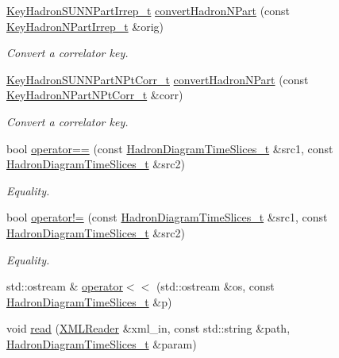 \begin{DoxyCompactItemize}
\mbox{\hyperlink{structHadron_1_1KeyHadronSUNNPartIrrep__t}{Key\+Hadron\+S\+U\+N\+N\+Part\+Irrep\+\_\+t}} \mbox{\hyperlink{namespaceHadron_a870585feaeca280be18774aa6242e2e9}{convert\+Hadron\+N\+Part}} (const \mbox{\hyperlink{structHadron_1_1KeyHadronNPartIrrep__t}{Key\+Hadron\+N\+Part\+Irrep\+\_\+t}} \&orig)
\begin{DoxyCompactList}\small\item\em Convert a correlator key. \end{DoxyCompactList}\item 
\mbox{\hyperlink{structHadron_1_1KeyHadronSUNNPartNPtCorr__t}{Key\+Hadron\+S\+U\+N\+N\+Part\+N\+Pt\+Corr\+\_\+t}} \mbox{\hyperlink{namespaceHadron_af69200410e93c702cf9e19f0c220bbef}{convert\+Hadron\+N\+Part}} (const \mbox{\hyperlink{structHadron_1_1KeyHadronNPartNPtCorr__t}{Key\+Hadron\+N\+Part\+N\+Pt\+Corr\+\_\+t}} \&corr)
\begin{DoxyCompactList}\small\item\em Convert a correlator key. \end{DoxyCompactList}\item 
bool \mbox{\hyperlink{namespaceHadron_a9eb9233a6f185d9919fc72243524ee67}{operator==}} (const \mbox{\hyperlink{structHadron_1_1HadronDiagramTimeSlices__t}{Hadron\+Diagram\+Time\+Slices\+\_\+t}} \&src1, const \mbox{\hyperlink{structHadron_1_1HadronDiagramTimeSlices__t}{Hadron\+Diagram\+Time\+Slices\+\_\+t}} \&src2)
\begin{DoxyCompactList}\small\item\em Equality. \end{DoxyCompactList}\item 
bool \mbox{\hyperlink{namespaceHadron_a795c74aad8519c0dc1b46c0e3c44f095}{operator!=}} (const \mbox{\hyperlink{structHadron_1_1HadronDiagramTimeSlices__t}{Hadron\+Diagram\+Time\+Slices\+\_\+t}} \&src1, const \mbox{\hyperlink{structHadron_1_1HadronDiagramTimeSlices__t}{Hadron\+Diagram\+Time\+Slices\+\_\+t}} \&src2)
\begin{DoxyCompactList}\small\item\em Equality. \end{DoxyCompactList}\item 
std\+::ostream \& \mbox{\hyperlink{namespaceHadron_a7fed56ec5f5f96e9e160939d5b138184}{operator$<$$<$}} (std\+::ostream \&os, const \mbox{\hyperlink{structHadron_1_1HadronDiagramTimeSlices__t}{Hadron\+Diagram\+Time\+Slices\+\_\+t}} \&p)
\item 
void \mbox{\hyperlink{namespaceHadron_ae5cdeeff0a8ced82bfb5f5a46595faf8}{read}} (\mbox{\hyperlink{classADATXML_1_1XMLReader}{X\+M\+L\+Reader}} \&xml\+\_\+in, const std\+::string \&path, \mbox{\hyperlink{structHadron_1_1HadronDiagramTimeSlices__t}{Hadron\+Diagram\+Time\+Slices\+\_\+t}} \&param)

\end{DoxyCompactItemize}
